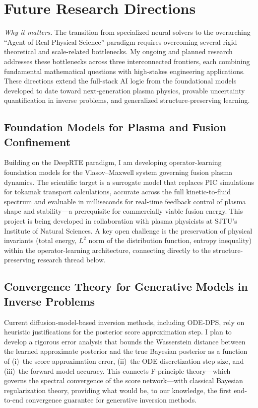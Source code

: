 \section{Future Research Directions}

\noindent\textit{Why it matters.}\enspace
The transition from specialized neural solvers to the overarching
``Agent of Real Physical Science'' paradigm requires overcoming several rigid
theoretical and scale-related bottlenecks. My ongoing and planned research
addresses these bottlenecks across three interconnected frontiers, each
combining fundamental mathematical questions with high-stakes engineering
applications. These directions extend the full-stack AI logic from the
foundational models developed to date toward next-generation plasma physics,
provable uncertainty quantification in inverse problems, and generalized
structure-preserving learning.

\subsection{Foundation Models for Plasma and Fusion Confinement}

Building on the DeepRTE paradigm, I am developing operator-learning
foundation models for the Vlasov--Maxwell system governing fusion plasma
dynamics.  The scientific target is a surrogate model that replaces PIC
simulations for tokamak transport calculations, accurate across the full
kinetic-to-fluid spectrum and evaluable in milliseconds for real-time feedback
control of plasma shape and stability---a prerequisite for commercially viable
fusion energy.  This project is being developed in collaboration with plasma
physicists at SJTU's Institute of Natural Sciences.  A key open challenge is
the preservation of physical invariants (total energy, $L^2$ norm of the
distribution function, entropy inequality) within the operator-learning
architecture, connecting directly to the structure-preserving research thread
below.

\subsection{Convergence Theory for Generative Models in Inverse Problems}

Current diffusion-model-based inversion methods, including ODE-DPS, rely on
heuristic justifications for the posterior score approximation step.  I plan
to develop a rigorous error analysis that bounds the Wasserstein distance
between the learned approximate posterior and the true Bayesian posterior as
a function of (i)~the score approximation error, (ii)~the ODE discretization
step size, and (iii)~the forward model accuracy.  This connects F-principle
theory---which governs the spectral convergence of the score network---with
classical Bayesian regularization theory, providing what would be, to our
knowledge, the first end-to-end convergence guarantee for generative inversion
methods.

